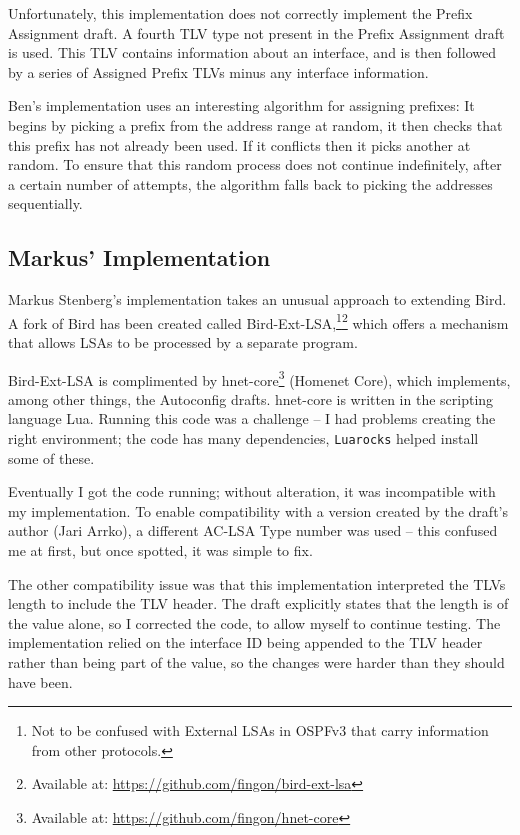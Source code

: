 Unfortunately, this implementation does not correctly implement the Prefix
Assignment draft. A fourth TLV type not present in the Prefix Assignment draft
is used. This TLV contains information about an interface, and is then followed
by a series of Assigned Prefix TLVs minus any interface information. 

Ben's implementation uses an interesting algorithm for assigning prefixes:
It begins by picking a prefix from the address range at random, it then checks
that this prefix has not already been used. If it conflicts then it picks
another at random. To ensure that this random process does not continue
indefinitely, after a certain number of attempts, the algorithm falls back to
picking the addresses sequentially. 

\subsection{Markus' Implementation}
Markus Stenberg's implementation takes an unusual approach to extending Bird. A
fork of Bird has been created called Bird-Ext-LSA\@,\footnote{Not to be
confused with External LSAs in OSPFv3 that carry information from other
protocols.}\footnote{Available at:
\url{https://github.com/fingon/bird-ext-lsa}} which offers a mechanism that
allows LSAs to be processed by a separate program. 

Bird-Ext-LSA is complimented by hnet-core\footnote{Available at:
\url{https://github.com/fingon/hnet-core}} (Homenet Core), which implements,
among other things, the Autoconfig drafts\@.  hnet-core is written in the
scripting language Lua. Running this code was a challenge -- I had problems
creating the right environment; the code has many dependencies,
\texttt{Luarocks} helped install some of these. 

Eventually I got the code running; without alteration, it was incompatible with
my implementation. To enable compatibility with a version created by the
draft's author (Jari Arrko), a different AC-LSA Type number was used -- this
confused me at first, but once spotted, it was simple to fix.

The other compatibility issue was that this implementation interpreted the TLVs
length to include the TLV header. The draft explicitly states that the length is
of the value alone, so I corrected the code, to allow myself to continue
testing. The implementation relied on the interface ID being appended to the
TLV header rather than being part of the value, so the changes were harder than
they should have been.

